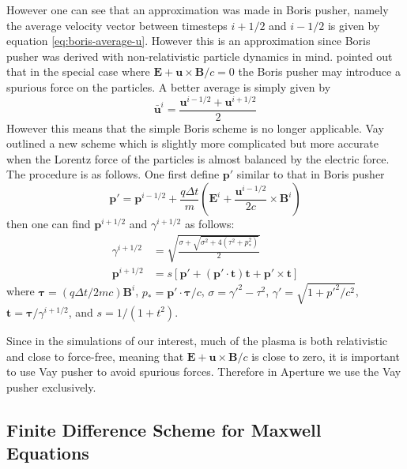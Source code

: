 However one can see that an approximation was made in Boris pusher, namely the
average velocity vector between timesteps $i+1/2$ and $i-1/2$ is given by
equation \eqref{eq:boris-average-u}. However this is an approximation since
Boris pusher was derived with non-relativistic particle dynamics in mind.
\citet{vay_simulation_2008} pointed out that in the special case where
$\mathbf{E} + \mathbf{u}\times \mathbf{B}/c = 0$ the Boris pusher may introduce a
spurious force on the particles. A better average is simply given by
\begin{equation}
  \label{eq:vay-average-u}
  \bar{\mathbf{u}}^i = \frac{\mathbf{u}^{i-1/2} + \mathbf{u}^{i+1/2}}{2}
\end{equation}
However this means that the simple Boris scheme is no longer applicable. Vay
outlined a new scheme which is slightly more complicated but more accurate when
the Lorentz force of the particles is almost balanced by the electric force. The
procedure is as follows. One first define $\mathbf{p}'$ similar to that in Boris
pusher
\begin{equation}
  \label{eq:vay-p-prime}
  \mathbf{p}' = \mathbf{p}^{i-1/2} + \frac{q\Delta t}{m}\left( \mathbf{E}^i + \frac{\mathbf{u}^{i-1/2}}{2c}\times \mathbf{B}^i \right)
\end{equation}
then one can find $\mathbf{p}^{i+1/2}$ and $\gamma^{i+1/2}$ as follows:
\begin{align}
  \label{eq:vay-solution}
  \gamma^{i+1/2} &= \sqrt{\frac{\sigma + \sqrt{\sigma^2 + 4(\tau^2 + p_{*}^2)}}{2}} \\
  \mathbf{p}^{i+1/2} &= s \left[ \mathbf{p}' + (\mathbf{p}'\cdot \mathbf{t})\mathbf{t} + \mathbf{p}'\times \mathbf{t} \right]
\end{align}
where $\bm{\tau} = (q\Delta t/2mc)\mathbf{B}^i$, $p_{*}=\mathbf{p}'\cdot\bm{\tau}/c$,
$\sigma = \gamma'^2-\tau^2$, $\gamma' = \sqrt{1 + p'^2/c^2}$, $\mathbf{t} =
\bm{\tau}/\gamma^{i+1/2}$, and $s = 1/(1 + t^2)$.

Since in the simulations of our interest, much of the plasma is both
relativistic and close to force-free, meaning that $\mathbf{E} +
\mathbf{u}\times \mathbf{B}/c$ is close to zero, it is important to use Vay
pusher to avoid spurious forces. Therefore in Aperture we use the Vay pusher
exclusively.

\subsection{Finite Difference Scheme for Maxwell Equations}
\label{sec:fd-maxwell}

